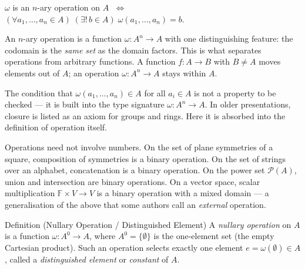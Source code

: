 \begin{remark}
$\omega$ is an $n$-ary operation on $A$
$\;\iff\;$
$(\forall a_1, \ldots, a_n \in A)\;
(\exists!\, b \in A)\;
\omega(a_1, \ldots, a_n) = b$.
\end{remark}

\begin{remark}
An $n$-ary operation is a function $\omega : A^n \to A$ with one
distinguishing feature: the codomain is the \emph{same set} as the
domain factors.
This is what separates operations from arbitrary functions.
A function $f : A \to B$ with $B \neq A$ moves elements out of $A$;
an operation $\omega : A^n \to A$ stays within $A$.
\end{remark}

\begin{remark}
The condition that $\omega(a_1, \ldots, a_n) \in A$ for all
$a_i \in A$ is not a property to be checked — it is built into the
type signature $\omega : A^n \to A$.
In older presentations, closure is listed as an axiom for groups and rings.
Here it is absorbed into the definition of operation itself.
\end{remark}

\begin{remark}
Operations need not involve numbers.
On the set of plane symmetries of a square, composition of symmetries is a
binary operation.
On the set of strings over an alphabet, concatenation is a binary operation.
On the power set $\mathcal{P}(A)$, union and intersection are binary
operations.
On a vector space, scalar multiplication
$\mathbb{F} \times V \to V$ is a binary operation with a mixed domain
— a generalisation of the above that some authors call an \emph{external} operation.
\end{remark}


\begin{definitionbox}{Definition (Nullary Operation / Distinguished Element)}
\label{def:nullary-op}
A \emph{nullary operation} on $A$ is a function $\omega : A^0 \to A$,
where $A^0 = \{\emptyset\}$ is the one-element set (the empty Cartesian
product).
Such an operation selects exactly one element $e = \omega(\emptyset) \in A$,
called a \emph{distinguished element} or \emph{constant} of $A$.
\end{definitionbox}

